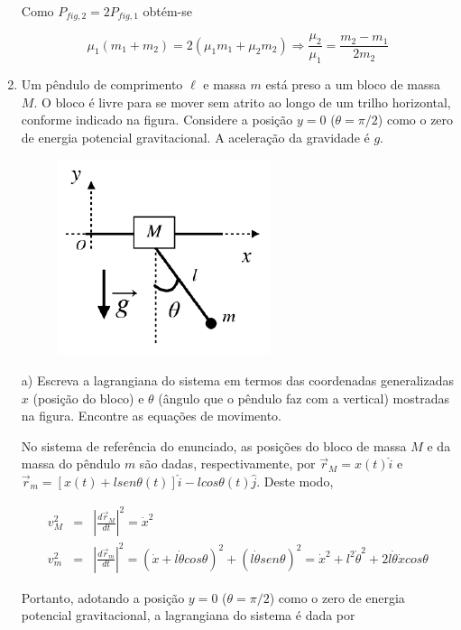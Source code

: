 \begin{enumerate}[start=1,label={\bfseries Q\arabic*.}]
Como $P_{fig,2} = 2P_{fig,1}$ obtém-se

$$
\mu_{1}(m_{1} + m_{2}) = 2(\mu_{1}m_{1} + \mu_{2}m_{2}) \Rightarrow \frac{\mu_{2}}{\mu_{1}} = \frac{m_{2} - m_{1}}{2m_{2}}
$$



\item Um pêndulo de comprimento $\ell$ e massa $m$ está preso a um bloco de massa $M$. O bloco é livre para se mover sem atrito ao longo de um trilho horizontal, conforme indicado na figura. Considere a posição $y = 0$ ($\theta = \pi/2$) como o zero de energia potencial gravitacional. A aceleração da gravidade é $g$.

\begin{figure}[H]
\centering
\includegraphics[scale=0.9]{classica-img/pendulo.png}
\end{figure}


a) Escreva a lagrangiana do sistema em termos das coordenadas generalizadas $x$ (posição do bloco) e $\theta$ (ângulo que o pêndulo faz com a vertical) mostradas na figura. Encontre as equações de movimento.

\resposta

No sistema de referência do enunciado, as posições do bloco de massa $M$ e da massa do pêndulo $m$ são dadas, respectivamente, por $\vec{r}_{M} = x(t)\hat{i}$ e $\vec{r}_{m} = [x(t) + l sen\theta(t)]\hat{i} - l cos\theta(t)\hat{j}$. Deste modo,


\begin{eqnarray}
	v_{M}^{2} & = & \left| \frac{d\vec{r}_{M}}{dt} \right|^{2} = \dot{x}^{2} \\
	v_{m}^{2} & = & \left| \frac{d\vec{r}_{m}}{dt} \right|^{2} = \left( \dot{x} + l\dot{\theta} cos \theta  \right)^{2} + \left( l\dot{\theta} sen \theta \right)^{2} = \dot{x}^{2} + l^{2} \dot{\theta}^{2} + 2 l\dot{\theta}\dot{x}cos \theta
\end{eqnarray}


Portanto, adotando a posição $y = 0$ ($\theta = \pi/2$) como o zero de energia potencial gravitacional, a lagrangiana do sistema é dada por


\end{enumerate}
